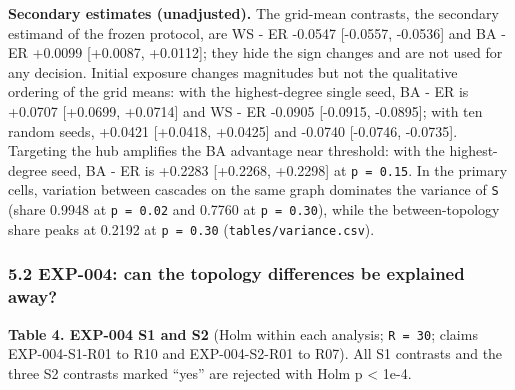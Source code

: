 \documentclass[
]{article}
\begin{document}
\textbf{Secondary estimates (unadjusted).} The grid-mean contrasts, the
secondary estimand of the frozen protocol, are WS - ER -0.0547
{[}-0.0557, -0.0536{]} and BA - ER +0.0099 {[}+0.0087, +0.0112{]}; they
hide the sign changes and are not used for any decision. Initial
exposure changes magnitudes but not the qualitative ordering of the grid
means: with the highest-degree single seed, BA - ER is +0.0707
{[}+0.0699, +0.0714{]} and WS - ER -0.0905 {[}-0.0915, -0.0895{]}; with
ten random seeds, +0.0421 {[}+0.0418, +0.0425{]} and -0.0740 {[}-0.0746,
-0.0735{]}. Targeting the hub amplifies the BA advantage near threshold:
with the highest-degree seed, BA - ER is +0.2283 {[}+0.2268, +0.2298{]}
at \texttt{p\ =\ 0.15}. In the primary cells, variation between cascades
on the same graph dominates the variance of \texttt{S} (share 0.9948 at
\texttt{p\ =\ 0.02} and 0.7760 at \texttt{p\ =\ 0.30}), while the
between-topology share peaks at 0.2192 at \texttt{p\ =\ 0.30}
(\texttt{tables/variance.csv}).

\subsubsection{5.2 EXP-004: can the topology differences be explained
away?}\label{exp-004-can-the-topology-differences-be-explained-away}

\textbf{Table 4. EXP-004 S1 and S2} (Holm within each analysis;
\texttt{R\ =\ 30}; claims EXP-004-S1-R01 to R10 and EXP-004-S2-R01 to
R07). All S1 contrasts and the three S2 contrasts marked ``yes'' are
rejected with Holm p \textless{} 1e-4.
\end{document}
